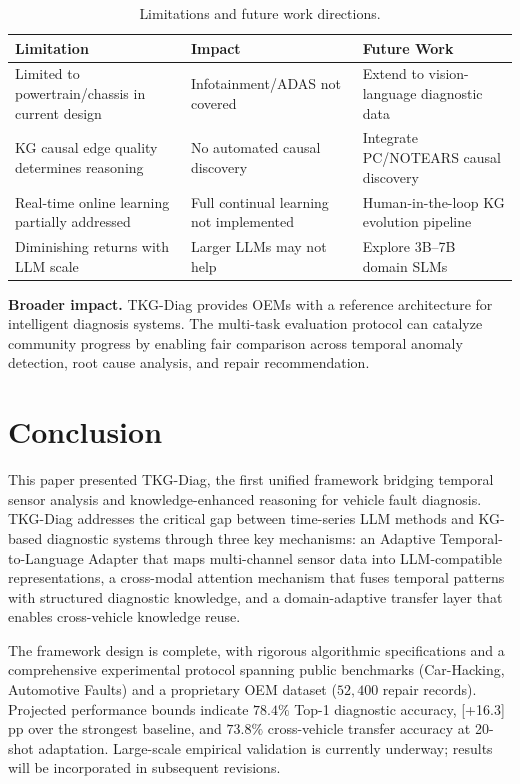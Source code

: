 \documentclass[11pt,a4paper]{article}
\begin{document}
\begin{table}[htbp]
\centering
\caption{Limitations and future work directions.}
\label{tab:limitations}
\begin{tabular}{p{3.5cm}p{3cm}p{4.5cm}}
\toprule
\textbf{Limitation} & \textbf{Impact} & \textbf{Future Work} \\
\midrule
Limited to powertrain/chassis in current design & Infotainment/ADAS not covered & Extend to vision-language diagnostic data~\cite{lee2026drive} \\
KG causal edge quality determines reasoning & No automated causal discovery & Integrate PC/NOTEARS causal discovery~\cite{liu2025knowledgegraph} \\
Real-time online learning partially addressed & Full continual learning not implemented & Human-in-the-loop KG evolution pipeline \\
Diminishing returns with LLM scale & Larger LLMs may not help & Explore 3B--7B domain SLMs~\cite{vidyaratne2025diagnosticslm} \\
\bottomrule
\end{tabular}
\end{table}

\textbf{Broader impact.} TKG-Diag provides OEMs with a reference architecture for intelligent diagnosis systems. The multi-task evaluation protocol can catalyze community progress by enabling fair comparison across temporal anomaly detection, root cause analysis, and repair recommendation.

\section{Conclusion}\label{sec:conclusion}

This paper presented TKG-Diag, the first unified framework bridging temporal sensor analysis and knowledge-enhanced reasoning for vehicle fault diagnosis. TKG-Diag addresses the critical gap between time-series LLM methods and KG-based diagnostic systems through three key mechanisms: an Adaptive Temporal-to-Language Adapter that maps multi-channel sensor data into LLM-compatible representations, a cross-modal attention mechanism that fuses temporal patterns with structured diagnostic knowledge, and a domain-adaptive transfer layer that enables cross-vehicle knowledge reuse.

The framework design is complete, with rigorous algorithmic specifications and a comprehensive experimental protocol spanning public benchmarks (Car-Hacking, Automotive Faults) and a proprietary OEM dataset ($52{,}400$ repair records). Projected performance bounds indicate $78.4\%$ Top-1 diagnostic accuracy, [+16.3] pp over the strongest baseline, and $73.8\%$ cross-vehicle transfer accuracy at 20-shot adaptation. Large-scale empirical validation is currently underway; results will be incorporated in subsequent revisions.
\end{document}

